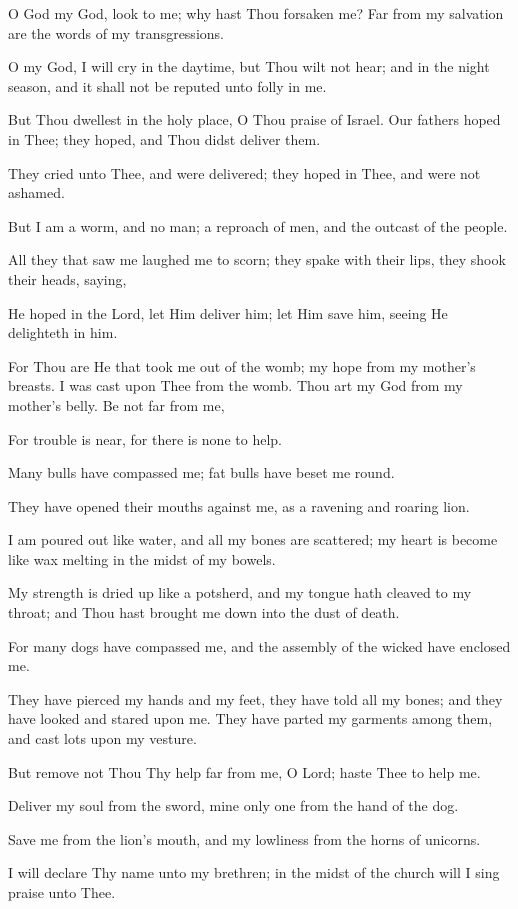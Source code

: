 O God my God, look to me; why hast Thou forsaken me? Far from my salvation are the words of my transgressions.

O my God, I will cry in the daytime, but Thou wilt not hear; and in the night season, and it shall not be reputed unto folly in me.

But Thou dwellest in the holy place, O Thou praise of Israel. Our fathers hoped in Thee; they hoped, and Thou didst deliver them.

They cried unto Thee, and were delivered; they hoped in Thee, and were not ashamed.

But I am a worm, and no man; a reproach of men, and the outcast of the people.

All they that saw me laughed me to scorn; they spake with their lips, they shook their heads, saying,

He hoped in the Lord, let Him deliver him; let Him save him, seeing He delighteth in him.

For Thou are He that took me out of the womb; my hope from my mother's breasts. I was cast upon Thee from the womb. Thou art my God from my mother's belly. Be not far from me,

For trouble is near, for there is none to help.

Many bulls have compassed me; fat bulls have beset me round.

They have opened their mouths against me, as a ravening and roaring lion.

I am poured out like water, and all my bones are scattered; my heart is become like wax melting in the midst of my bowels.

My strength is dried up like a potsherd, and my tongue hath cleaved to my throat; and Thou hast brought me down into the dust of death.

For many dogs have compassed me, and the assembly of the wicked have enclosed me.

They have pierced my hands and my feet, they have told all my bones; and they have looked and stared upon me. They have parted my garments among them, and cast lots upon my vesture.

But remove not Thou Thy help far from me, O Lord; haste Thee to help me.

Deliver my soul from the sword, mine only one from the hand of the dog.

Save me from the lion's mouth, and my lowliness from the horns of unicorns.

I will declare Thy name unto my brethren; in the midst of the church will I sing praise unto Thee.

